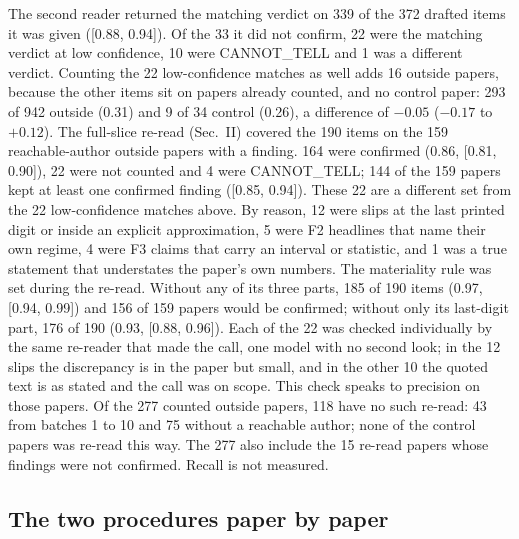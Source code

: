 \documentclass[reprint,amsmath,amssymb,aps,superscriptaddress,nofootinbib]{revtex4-2}
\begin{document}
The second reader returned the matching verdict on 339 of the 372 drafted items it was given ([0.88, 0.94]). Of the 33 it did not confirm, 22 were the matching verdict at low confidence, 10 were CANNOT\_TELL and 1 was a different verdict. Counting the 22 low-confidence matches as well adds 16 outside papers, because the other items sit on papers already counted, and no control paper: 293 of 942 outside (0.31) and 9 of 34 control (0.26), a difference of $-0.05$ ($-0.17$ to $+0.12$). The full-slice re-read (Sec.~II) covered the 190 items on the 159 reachable-author outside papers with a finding. 164 were confirmed (0.86, [0.81, 0.90]), 22 were not counted and 4 were CANNOT\_TELL; 144 of the 159 papers kept at least one confirmed finding ([0.85, 0.94]). These 22 are a different set from the 22 low-confidence matches above. By reason, 12 were slips at the last printed digit or inside an explicit approximation, 5 were F2 headlines that name their own regime, 4 were F3 claims that carry an interval or statistic, and 1 was a true statement that understates the paper's own numbers. The materiality rule was set during the re-read. Without any of its three parts, 185 of 190 items (0.97, [0.94, 0.99]) and 156 of 159 papers would be confirmed; without only its last-digit part, 176 of 190 (0.93, [0.88, 0.96]). Each of the 22 was checked individually by the same re-reader that made the call, one model with no second look; in the 12 slips the discrepancy is in the paper but small, and in the other 10 the quoted text is as stated and the call was on scope. This check speaks to precision on those papers. Of the 277 counted outside papers, 118 have no such re-read: 43 from batches 1 to 10 and 75 without a reachable author; none of the control papers was re-read this way. The 277 also include the 15 re-read papers whose findings were not confirmed. Recall is not measured.

\subsection{The two procedures paper by paper}
\end{document}
